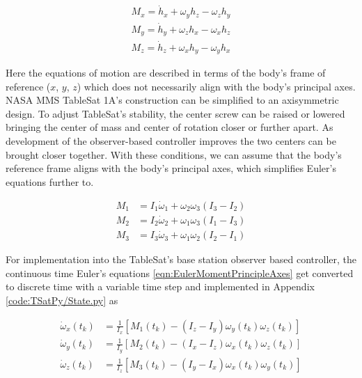 \begin{subequations}
  \begin{align}
    M_x = \dot{h}_x + \omega_y h_z - \omega_z h_y \\
    M_y = \dot{h}_y + \omega_z h_x - \omega_x h_z \\
    M_z = \dot{h}_z + \omega_x h_y - \omega_y h_x
  \end{align}
  \label{eqn:EulerMoment}
\end{subequations}

Here the equations of motion are described in terms of the body's frame of reference ($x$, $y$, $z$) which does not necessarily align with the body's principal axes.  NASA MMS TableSat 1A's construction can be simplified to an axisymmetric design.  To adjust TableSat's stability, the center screw can be raised or lowered bringing the center of mass and center of rotation closer or further apart.  As development of the observer-based controller improves the two centers can be brought closer together.  With these conditions, we can assume that the body's reference frame aligns with the body's principal axes, which simplifies Euler's equations further to.

\begin{subequations}
  \begin{align}
    M_1 & = I_1 \dot{\omega}_1 + \omega_2 \omega_3 (I_3 - I_2) \\
    M_2 & = I_2 \dot{\omega}_2 + \omega_1 \omega_3 (I_1 - I_3) \\
    M_3 & = I_3 \dot{\omega}_3 + \omega_1 \omega_2 (I_2 - I_1)
  \end{align}
  \label{eqn:EulerMomentPrincipleAxes}
\end{subequations}

For implementation into the TableSat's base station observer based controller, the continuous time Euler's equations \ref{eqn:EulerMomentPrincipleAxes} get converted to discrete time with a variable time step and implemented in Appendix \ref{code:TSatPy/State.py} as

\begin{subequations}
  \begin{align}
    \dot{\omega}_{x}(t_{k}) & = \frac{1}{I_x} \left[ M_1(t_{k}) - (I_z - I_y) \omega_{y}(t_k) \omega_{z}(t_k) \right] \\
    \dot{\omega}_{y}(t_{k}) & = \frac{1}{I_y} \left[ M_2(t_{k}) - (I_x - I_z) \omega_{x}(t_k) \omega_{z}(t_k) \right] \\
    \dot{\omega}_{z}(t_{k}) & = \frac{1}{I_z} \left[ M_3(t_{k}) - (I_y - I_x) \omega_{x}(t_k) \omega_{y}(t_k) \right]
  \end{align}
  \label{eqn:DiscreteEulerMomentEquations}
\end{subequations}

